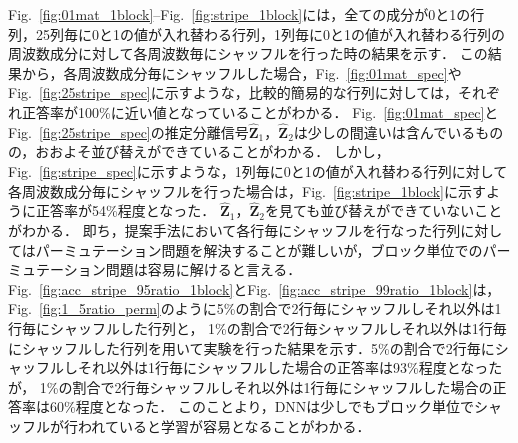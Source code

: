 Fig.~\ref{fig:01mat_1block}--Fig.~\ref{fig:stripe_1block}には，全ての成分が0と1の行列，25列毎に0と1の値が入れ替わる行列，1列毎に0と1の値が入れ替わる行列の周波数成分に対して各周波数毎にシャッフルを行った時の結果を示す．
この結果から，各周波数成分毎にシャッフルした場合，Fig.~\ref{fig:01mat_spec}やFig.~\ref{fig:25stripe_spec}に示すような，比較的簡易的な行列に対しては，それぞれ正答率が100\%に近い値となっていることがわかる．
Fig.~\ref{fig:01mat_spec}とFig.~\ref{fig:25stripe_spec}の推定分離信号$\hat{\bm{Z}}_1$，$\hat{\bm{Z}}_2$は少しの間違いは含んでいるものの，おおよそ並び替えができていることがわかる．
しかし，Fig.~\ref{fig:stripe_spec}に示すような，1列毎に0と1の値が入れ替わる行列に対して各周波数成分毎にシャッフルを行った場合は，Fig.~\ref{fig:stripe_1block}に示すように正答率が54\%程度となった．
$\hat{\bm{Z}}_1$，$\hat{\bm{Z}}_2$を見ても並び替えができていないことがわかる．
即ち，提案手法において各行毎にシャッフルを行なった行列に対してはパーミュテーション問題を解決することが難しいが，ブロック単位でのパーミュテーション問題は容易に解けると言える．
Fig.~\ref{fig:acc_stripe_95ratio_1block}とFig.~\ref{fig:acc_stripe_99ratio_1block}は，Fig.~\ref{fig:1_5ratio_perm}のように5\%の割合で2行毎にシャッフルしそれ以外は1行毎にシャッフルした行列と，
1\%の割合で2行毎シャッフルしそれ以外は1行毎にシャッフルした行列を用いて実験を行った結果を示す．5\%の割合で2行毎にシャッフルしそれ以外は1行毎にシャッフルした場合の正答率は93\%程度となったが，
1\%の割合で2行毎シャッフルしそれ以外は1行毎にシャッフルした場合の正答率は60\%程度となった．
このことより，DNNは少しでもブロック単位でシャッフルが行われていると学習が容易となることがわかる．

